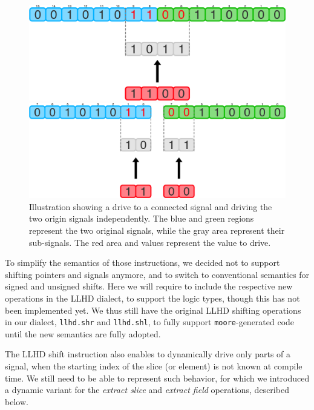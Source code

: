 \begin{figure}[ht]
    \centering
    \begin{minipage}{0.49\textwidth}
        \includegraphics[width=\textwidth]{gfx/DrvConn.png}
    \end{minipage}
    \hfill
    \begin{minipage}{0.49\textwidth}
        \includegraphics[width=\textwidth]{gfx/DrvSplit.png}
    \end{minipage}
    \caption[Illustration showing a drive to a connected signal vs. driving the two origin signals independently.]{Illustration showing a drive to a connected signal and driving the two origin signals independently. The blue and green regions represent the two original signals, while the gray area represent their sub-signals. The red area and values represent the value to drive.}
    \label{fig:drvconn}
\end{figure}

To simplify the semantics of those instructions, we decided not to support shifting pointers and signals anymore, and to switch to conventional semantics for signed and unsigned shifts. Here we will require to include the respective new operations in the LLHD dialect, to support the logic types, though this has not been implemented yet. We thus still have the original LLHD shifting operations in our dialect, \texttt{llhd.shr} and \texttt{llhd.shl}, to fully support \texttt{moore}-generated code until the new semantics are fully adopted.

The LLHD shift instruction also enables to dynamically drive only parts of a signal, when the starting index of the slice (or element) is not known at compile time. We still need to be able to represent such behavior, for which we introduced a dynamic variant for the \textit{extract slice} and \textit{extract field} operations, described below.

